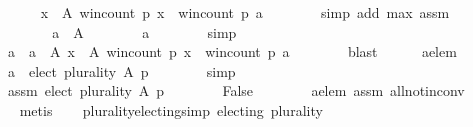 \begin{isabellebody}
\ \ \ \ \isamarkupfalse%
\isanewline
\ \ \ \ \ \ {\isachardoublequoteopen}{\isasymforall}x\ {\isasymin}\ A{\isachardot}{\kern0pt}\ win{\isacharunderscore}{\kern0pt}count\ p\ x\ {\isasymle}\ win{\isacharunderscore}{\kern0pt}count\ p\ a{\isachardoublequoteclose}\isanewline
\ \ \ \ \ \ \isamarkupfalse%
\ {\isacharparenleft}{\kern0pt}simp\ add{\isacharcolon}{\kern0pt}\ max\ assm{}{\isacharparenright}{\kern0pt}\isanewline
\ \ \ \ \isamarkupfalse%
\ \isamarkupfalse%
\isanewline
\ \ \ \ \ \ {\isachardoublequoteopen}a\ {\isasymin}\ A{\isachardoublequoteclose}\isanewline
\ \ \ \ \ \ \isamarkupfalse%
\ a\isanewline
\ \ \ \ \ \ \isamarkupfalse%
\ simp\isanewline
\ \ \ \ \isamarkupfalse%
\ \isamarkupfalse%
\isanewline
\ \ \ \ \ \ {\isachardoublequoteopen}a\ {\isasymin}\ {\isacharbraceleft}{\kern0pt}a\ {\isasymin}\ A{\isachardot}{\kern0pt}\ {\isasymforall}x\ {\isasymin}\ A{\isachardot}{\kern0pt}\ win{\isacharunderscore}{\kern0pt}count\ p\ x\ {\isasymle}\ win{\isacharunderscore}{\kern0pt}count\ p\ a{\isacharbraceright}{\kern0pt}{\isachardoublequoteclose}\isanewline
\ \ \ \ \ \ \isamarkupfalse%
\ blast\isanewline
\ \ \ \ \isamarkupfalse%
\ a{\isacharunderscore}{\kern0pt}elem{\isacharcolon}{\kern0pt}\isanewline
\ \ \ \ \ \ {\isachardoublequoteopen}a\ {\isasymin}\ elect\ plurality\ A\ p{\isachardoublequoteclose}\isanewline
\ \ \ \ \ \ \isamarkupfalse%
\ simp\isanewline
\ \ \ \ \isamarkupfalse%
\isanewline
\ \ \ \ \ \ assm{}{\isacharcolon}{\kern0pt}\ {\isachardoublequoteopen}elect\ plurality\ A\ p\ {\isacharequal}{\kern0pt}\ {\isacharbraceleft}{\kern0pt}{\isacharbraceright}{\kern0pt}{\isachardoublequoteclose}\isanewline
\ \ \ \ \isamarkupfalse%
\ {\isachardoublequoteopen}False{\isachardoublequoteclose}\isanewline
\ \ \ \ \ \ \isamarkupfalse%
\ a{\isacharunderscore}{\kern0pt}elem\ assm{}\ all{\isacharunderscore}{\kern0pt}not{\isacharunderscore}{\kern0pt}in{\isacharunderscore}{\kern0pt}conv\isanewline
\ \ \ \ \ \ \isamarkupfalse%
\ metis\isanewline
\ \ \isamarkupfalse%
\isanewline
{}\isamarkupfalse%
%
\endisatagproof
{\isafoldproof}%
%
\isadelimproof
\isanewline
%
\endisadelimproof
\isanewline
\isanewline
{}\isamarkupfalse%
\ plurality{\isacharunderscore}{\kern0pt}electing{\isacharbrackleft}{\kern0pt}simp{\isacharbrackright}{\kern0pt}{\isacharcolon}{\kern0pt}\ {\isachardoublequoteopen}electing\ plurality{\isachardoublequoteclose}\isanewline

\end{isabellebody}
